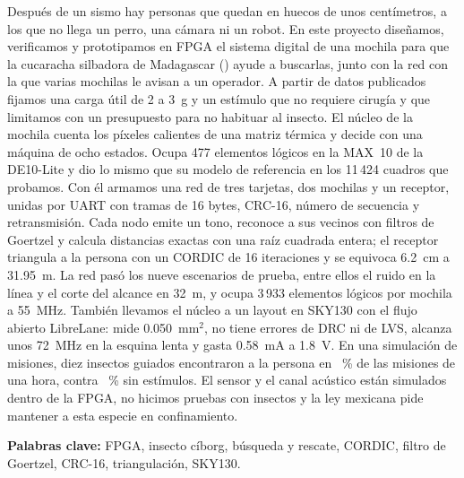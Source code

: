 \begin{titlepage}
\vfill
\begin{tcolorbox}[colback=white,colframe=Primary,boxrule=0.9pt,arc=2mm,
  width=\textwidth,title=\textbf{Resumen},colbacktitle=Primary,coltitle=white,
  left=2mm,right=2mm,top=1mm,bottom=1mm]
\footnotesize\justifying
Después de un sismo hay personas que quedan en huecos de unos centímetros, a los que no llega un perro, una cámara ni un
robot. En este proyecto diseñamos, verificamos y prototipamos en FPGA el sistema digital de una mochila para que la
cucaracha silbadora de Madagascar (\especie) ayude a buscarlas, junto con la red con la que varias mochilas le avisan a un
operador. A partir de datos publicados fijamos una carga útil de 2 a 3~g y un estímulo que no requiere cirugía y que
limitamos con un presupuesto para no habituar al insecto. El núcleo de la mochila cuenta los píxeles calientes de una
matriz térmica y decide con una máquina de ocho estados. Ocupa 477 elementos lógicos en la MAX~10 de la DE10-Lite y dio lo
mismo que su modelo de referencia en los 11\,424 cuadros que probamos. Con él armamos una red de tres tarjetas, dos
mochilas y un receptor, unidas por UART con tramas de 16 bytes, CRC-16, número de secuencia y retransmisión. Cada nodo
emite un tono, reconoce a sus vecinos con filtros de Goertzel y calcula distancias exactas con una raíz cuadrada entera; el
receptor triangula a la persona con un CORDIC de 16 iteraciones y se equivoca 6.2~cm a 31.95~m. La red pasó los nueve
escenarios de prueba, entre ellos el ruido en la línea y el corte del alcance en 32~m, y ocupa 3\,933 elementos lógicos por
mochila a 55~MHz. También llevamos el núcleo a un layout en SKY130 con el flujo abierto LibreLane: mide 0.050~mm$^2$, no
tiene errores de DRC ni de LVS, alcanza unos 72~MHz en la esquina lenta y gasta 0.58~mA a 1.8~V. En una simulación de
\numMisiones{} misiones, diez insectos guiados encontraron a la persona en \pGuiadaSesenta~\% de las misiones de una hora,
contra \pPasivaSesenta~\% sin estímulos. El sensor y el canal acústico están simulados dentro de la FPGA, no hicimos pruebas
con insectos y la ley mexicana pide mantener a esta especie en confinamiento.

\vspace{2pt}
\textbf{Palabras clave:} FPGA, insecto cíborg, búsqueda y rescate, CORDIC, filtro de Goertzel,
CRC-16, triangulación, SKY130.
\end{tcolorbox}
\end{titlepage}

